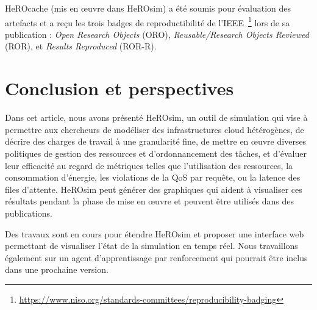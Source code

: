 HeROcache (mis en œuvre dans HeROsim) a été soumis pour évaluation des artefacts et a reçu les trois badges de reproductibilité de l'IEEE~\footnote{\href{https://www.niso.org/standards-committees/reproducibility-badging}{https://www.niso.org/standards-committees/reproducibility-badging}} lors de sa publication : \textit{Open Research Objects} (ORO), \textit{Reusable/Research Objects Reviewed} (ROR), et \textit{Results Reproduced} (ROR-R).

\section{Conclusion et perspectives}
\label{section:herosim-conclusion}

Dans cet article, nous avons présenté HeROsim, un outil de simulation qui vise à permettre aux chercheurs de modéliser des infrastructures cloud hétérogènes, de décrire des charges de travail à une granularité fine, de mettre en œuvre diverses politiques de gestion des ressources et d'ordonnancement des tâches, et d'évaluer leur efficacité au regard de métriques telles que l'utilisation des ressources, la consommation d'énergie, les violations de la \gls{QoS} par requête, ou la latence des files d'attente. HeROsim peut générer des graphiques qui aident à visualiser ces résultats pendant la phase de mise en œuvre et peuvent être utilisés dans des publications.

Des travaux sont en cours pour étendre HeROsim et proposer une interface web permettant de visualiser l'état de la simulation en temps réel. Nous travaillons également sur un agent d'apprentissage par renforcement qui pourrait être inclus dans une prochaine version.
